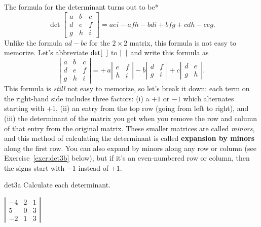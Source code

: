 \documentclass{watsonbook}
\begin{document}
The formula for the determinant turns out to be*
\[
  \det \left[
    \begin{array}{ccc}
      a & b & c \\ d & e & f \\ g & h & i
    \end{array}
  \right] = 
  aei - afh - bdi + bfg + cdh - ceg. 
\]
Unlike the formula $ad - bc$ for the $2\times 2$ matrix, this formula
is not easy to memorize. Let's abbreviate $\det [ \hphantom{a} ]$ to
$| \hphantom{a}|$ and write this formula as
\[
  \left|\begin{array}{ccc} a & b & c \\ d & e & f \\ g & h & i \end{array}\right| = 
  +\hspace{2pt}a \left|\begin{array}{cc} e & f \\  h & i \end{array}\right| 
  -b \left|\begin{array}{cc} d & f \\  g & i \end{array}\right| 
  +c \left|\begin{array}{cc} d & e \\  g & h \end{array}\right|. 
\]
This formula is \textit{still} not easy to memorize, so let's break it
down: each term on the right-hand side includes three factors: (i) a $+1$ or
$-1$ which alternates starting with $+1$, (ii) an entry from the top
row (going from left to right), and (iii) the determinant of the matrix you
get when you remove the row and column of that entry from the original
matrix. These smaller matrices are called \textit{minors}, and this
method of calculating the determinant is called \textbf{expansion by
  minors} along the first row. You can also expand by minors along any
row or column (see Exercise~\ref{exer:det3b} below), but if it's an
even-numbered row or column, then the signs start with $-1$ instead of
$+1$.

\begin{exercise}{}{det3a} \setcounter{subitm}{1}
  Calculate each determinant. 

  {$\left|
      \begin{array}{ccc}
        -4 & 2 & 1 \\ 5 & 0 & 3 \\ -2 & 1 & 3
      \end{array}\right|$}
\end{exercise}
\end{document}
